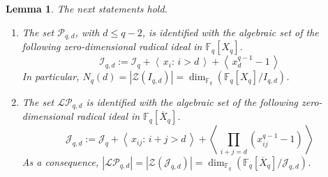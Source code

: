 \documentclass[pdflatex,sn-mathphys-num]{sn-jnl}
\theoremstyle{thmstyleone}%
\newtheorem{lemma}{Lemma}[section]
\begin{document}
\begin{lemma}\label{lemma_affine_degrees} The next statements hold.
\begin{enumerate}
    \item[a)] The set $\mathcal{P}_{q,d}$, with $d\leq q-2$, is identified with the algebraic set of the following zero-dimensional radical ideal in $\mathbb{F}_q[X_q]$.
\[\mathcal{I}_{q,d}:=\mathcal{I}_q + \left\langle\,x_i\colon\, i>d\,\right\rangle + \left\langle\,x_d^{q-1}-1\,\right\rangle\] 
In particular, $N_q(d)=|\mathcal{Z}(I_{q,d})|=\dim_{\mathbb{F}_q}(\mathbb{F}_q[X_q]/I_{q,d})$.

\vspace{0.2cm}

    \item[b)] The set $\mathcal{LP}_{q,d}$ is identified with the algebraic set of the following zero-dimensional radical ideal in $\mathbb{F}_q[\overline{X}_q]$.
\[\mathcal{J}_{q,d}:= \mathcal{J}_q + \left\langle\,x_{ij}\colon\, i+j>d\,\right\rangle + \left\langle\,\prod_{i+j=d}(x_{ij}^{q-1}-1)\,\right\rangle\]
As a consequence, $|\mathcal{LP}_{q,d}|=|\mathcal{Z}(\mathcal{J}_{q,d})|=\dim_{\mathbb{F}_q}(\mathbb{F}_q[\overline{X}_q]/\mathcal{J}_{q,d})$.
\end{enumerate}
\end{lemma}

\vspace{0.2cm}
\end{document}
